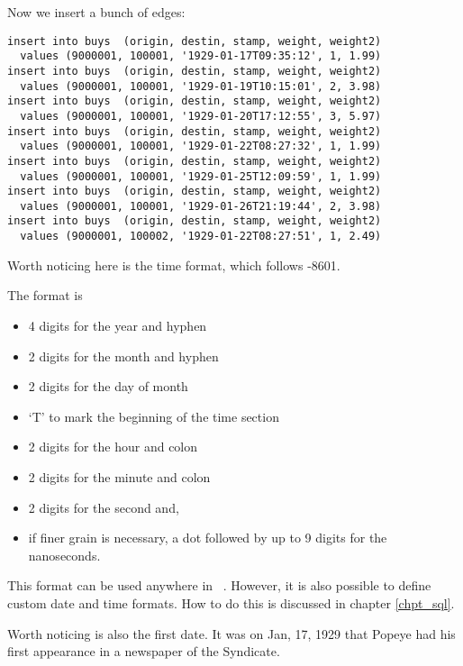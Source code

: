 Now we insert a bunch of edges:

\begin{sqlcode}
\begin{lstlisting}
insert into buys  (origin, destin, stamp, weight, weight2)
  values (9000001, 100001, '1929-01-17T09:35:12', 1, 1.99)
insert into buys  (origin, destin, stamp, weight, weight2)
  values (9000001, 100001, '1929-01-19T10:15:01', 2, 3.98)
insert into buys  (origin, destin, stamp, weight, weight2)
  values (9000001, 100001, '1929-01-20T17:12:55', 3, 5.97)
insert into buys  (origin, destin, stamp, weight, weight2)
  values (9000001, 100001, '1929-01-22T08:27:32', 1, 1.99)
insert into buys  (origin, destin, stamp, weight, weight2)
  values (9000001, 100001, '1929-01-25T12:09:59', 1, 1.99)
insert into buys  (origin, destin, stamp, weight, weight2)
  values (9000001, 100001, '1929-01-26T21:19:44', 2, 3.98)
insert into buys  (origin, destin, stamp, weight, weight2)
  values (9000001, 100002, '1929-01-22T08:27:51', 1, 2.49)
\end{lstlisting}
\end{sqlcode}

\begin{minipage}{\textwidth}
Worth noticing here is the time format,
which follows -8601.

The format is
\begin{itemize}
\item 4 digits for the year and hyphen
\item 2 digits for the month and hyphen
\item 2 digits for the day of month
\item `T' to mark the beginning of the time section
\item 2 digits for the hour and colon
\item 2 digits for the minute and colon
\item 2 digits for the second and,
\item if finer grain is necessary,
a dot followed by up to 9 digits
for the nanoseconds.
\end{itemize}
\end{minipage}

This format can be used anywhere in \nowdb\ \sql.
However, it is also possible to define custom
date and time formats. How to do this is discussed
in chapter \ref{chpt_sql}.

Worth noticing is also the first date.
It was on Jan, 17, 1929 that Popeye had his first
appearance in a newspaper of the 
Syndicate.


